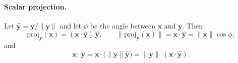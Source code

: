 \documentclass{ee102_notes}
\begin{document}
\paragraph{Scalar projection.}
Let $\hat{\mathbf{y}}=\mathbf{y}/\|\mathbf{y}\|$ and let $\phi$ be the angle
between $\mathbf{x}$ and $\mathbf{y}$. Then
\[
\text{proj}_{\mathbf{y}}(\mathbf{x})=(\mathbf{x}\cdot\hat{\mathbf{y}})\,\hat{\mathbf{y}},
\qquad
\|\text{proj}_{\mathbf{y}}(\mathbf{x})\|
=\mathbf{x}\cdot\hat{\mathbf{y}}=\|\mathbf{x}\|\cos\phi,
\]
and
\[
\mathbf{x}\cdot\mathbf{y}
=\mathbf{x}\cdot\big(\|\mathbf{y}\|\hat{\mathbf{y}}\big)
=\|\mathbf{y}\|\;(\mathbf{x}\cdot\hat{\mathbf{y}}).
\]

\end{document}
